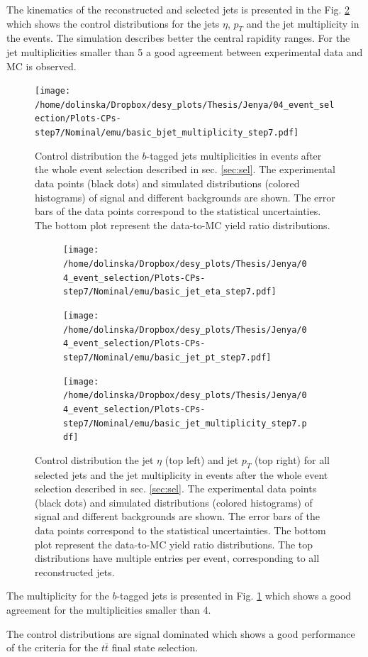 The kinematics of the reconstructed and selected jets is presented in the Fig. \ref{fig:CPjetskin} which shows the control distributions for the
jets $\eta$, $p_{T}$ and the jet multiplicity in the events. The simulation describes better the central rapidity ranges. For the jet multiplicities
smaller than 5 a good agreement between experimental data and MC is observed.
 
 \begin{figure}[h]
  \centering
  \texttt{[image: /home/dolinska/Dropbox/desy\_plots/Thesis/Jenya/04\_event\_selection/Plots-CPs-step7/Nominal/emu/basic\_bjet\_multiplicity\_step7.pdf]}
  \caption{Control distribution the $b$-tagged jets multiplicities in events after the whole event selection described in sec. \ref{sec:sel}. 
  The experimental data points (black dots)
  and simulated distributions (colored histograms) of signal and different backgrounds are shown. The error bars of the data points
  correspond to the statistical uncertainties. The bottom plot represent the data-to-MC yield ratio distributions.}
  \label{fig:CPbJetMult}
 \end{figure}
 
 \begin{figure}[h]
 \centering
 \begin{subfigure}
   \centering
   \texttt{[image: /home/dolinska/Dropbox/desy\_plots/Thesis/Jenya/04\_event\_selection/Plots-CPs-step7/Nominal/emu/basic\_jet\_eta\_step7.pdf]}
 \end{subfigure}
 \begin{subfigure}
   \centering
   \texttt{[image: /home/dolinska/Dropbox/desy\_plots/Thesis/Jenya/04\_event\_selection/Plots-CPs-step7/Nominal/emu/basic\_jet\_pt\_step7.pdf]}
 \end{subfigure}
  \begin{subfigure}
   \centering
   \texttt{[image: /home/dolinska/Dropbox/desy\_plots/Thesis/Jenya/04\_event\_selection/Plots-CPs-step7/Nominal/emu/basic\_jet\_multiplicity\_step7.pdf]}
 \end{subfigure}
 \caption{Control distribution the jet $\eta$ (top left) and jet $p_{T}$ (top right) for all selected jets and the jet multiplicity in events 
  after the whole event selection described in sec. \ref{sec:sel}. 
  The experimental data points (black dots)
  and simulated distributions (colored histograms) of signal and different backgrounds are shown. The error bars of the data points
  correspond to the statistical uncertainties. The bottom plot represent the data-to-MC yield ratio distributions.
  The top distributions have multiple entries per event, corresponding to all reconstructed jets.}
 \label{fig:CPjetskin}
 \end{figure}
 
The multiplicity for the $b$-tagged jets is presented in Fig. \ref{fig:CPbJetMult} which shows a good agreement for the multiplicities smaller than 4.
 
The control distributions are signal dominated which shows a good performance of the criteria for the $t\bar{t}$ final state selection.



